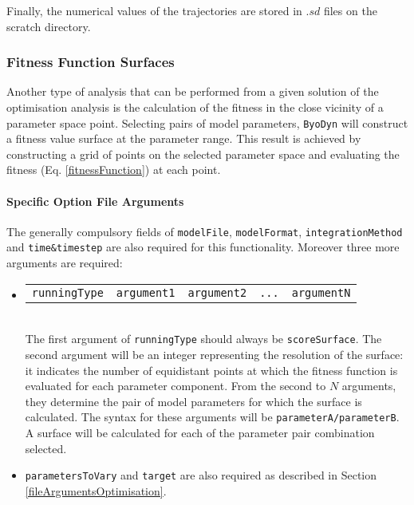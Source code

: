 \documentclass[a4paper, 11pt]{article}
\begin{document}
Finally, the numerical values of the trajectories are stored in $.sd$ files on the scratch directory.
\subsubsection{Fitness Function Surfaces}
Another type of analysis that can be performed from a given solution of the optimisation analysis is the calculation of the fitness in the close vicinity of a parameter space point.
Selecting pairs of model parameters, \texttt{ByoDyn} will construct a fitness value surface at the parameter range. 
This result is achieved by constructing a grid of points on the selected parameter space and evaluating the fitness (Eq. \ref{fitnessFunction}) at each point.
\paragraph{Specific Option File Arguments}
The generally compulsory fields of \texttt{modelFile}, \texttt{modelFormat}, \texttt{integrationMethod} and \texttt{time\&timestep} are also required for this functionality.
Moreover three more arguments are required:
\begin{itemize}
  \item \begin{tabular}{ccccc}\texttt{runningType}&\texttt{argument1}&\texttt{argument2}&\texttt{...}&\texttt{argumentN}\end{tabular}\\[1.5ex]
    The first argument of \texttt{runningType} should always be \texttt{scoreSurface}.
    The second argument will be an integer representing the resolution of the surface: it indicates the number of equidistant points at which the fitness function is evaluated for each parameter component.
    From the second to $N$ arguments, they determine the pair of model parameters for which the surface is calculated.
    The syntax for these arguments will be \texttt{parameterA/parameterB}.
    A surface will be calculated for each of the parameter pair combination selected.
  \item \texttt{parametersToVary} and \texttt{target} are also required as described in Section \ref{fileArgumentsOptimisation}.
\end{itemize}
\end{document}
